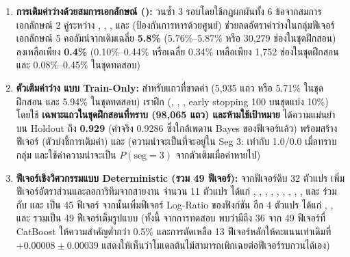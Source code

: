 \begin{enumerate}
    \item \textbf{การเติมค่าว่างด้วยสมการเอกลักษณ์ ():} วนซ้ำ 3 รอบโดยใช้กฎผกผันทั้ง 6 ข้อจากสมการเอกลักษณ์ 2 คู่ระหว่าง , , ,  และ  (ป้องกันการหารด้วยศูนย์) ช่วยลดอัตราค่าว่างในกลุ่มฟีเจอร์เอกลักษณ์ 5 คอลัมน์จากเดิมเฉลี่ย \textbf{5.8\%} (5.76\%--5.87\% หรือ 30,279 ช่องในชุดฝึกสอน) ลงเหลือเพียง \textbf{0.4\%} (0.10\%--0.44\% หรือเฉลี่ย 0.34\% เหลือเพียง 1,752 ช่องในชุดฝึกสอน และ 0.08\%--0.45\% ในชุดทดสอบ)
    \item \textbf{ตัวเติมค่าว่าง  แบบ Train-Only:} สำหรับแถวที่ขาดค่า  (5,935 แถว หรือ 5.71\% ในชุดฝึกสอน และ 5.94\% ในชุดทดสอบ) เราฝึก  (, , , early stopping 100 บนชุดแบ่ง 10\%) โดยใช้ \textbf{เฉพาะแถวในชุดฝึกสอนที่ทราบ  (98,065 แถว) และห้ามใช้เป้าหมาย } ได้ความแม่นยำบน Holdout ถึง \textbf{0.929} (ค่าจริง 0.9286 ซึ่งใกล้เพดาน Bayes ของฟีเจอร์แล้ว) พร้อมสร้างฟีเจอร์  (ตัวบ่งชี้การเติมค่า) และ  (ความน่าจะเป็นที่จะอยู่ใน Seg 3: เท่ากับ 1.0/0.0 เมื่อทราบกลุ่ม และใช้ค่าความน่าจะเป็น $P(\text{seg}=3)$ จากตัวเติมเมื่อค่าหายไป)
    \item \textbf{ฟีเจอร์เชิงวิศวกรรมแบบ Deterministic (รวม 49 ฟีเจอร์):} จากฟีเจอร์ดิบ 32 ตัวแปร เพิ่มฟีเจอร์อัตราส่วนและลอการิทึมจากสายงาน  จำนวน 11 ตัวแปร ได้แก่ , , , , , , , , ,  และ  ร่วมกับ  และ  เป็น 45 ฟีเจอร์ จากนั้นเพิ่มฟีเจอร์ Log-Ratio ของฟังก์ชัน  อีก 4 ตัวแปร ได้แก่ , ,  และ  รวมเป็น 49 ฟีเจอร์เต็มรูปแบบ (ทั้งนี้ จากการทดสอบ  พบว่ามีถึง 36 จาก 49 ฟีเจอร์ที่ CatBoost ให้ความสำคัญต่ำกว่า 0.5\% และการตัดเหลือ 13 ฟีเจอร์หลักให้คะแนนเท่าเดิมที่ $+0.00008 \pm 0.00039$ แสดงให้เห็นว่าโมเดลต้นไม้สามารถเพิกเฉยต่อฟีเจอร์รบกวนได้เอง)
\end{enumerate}

